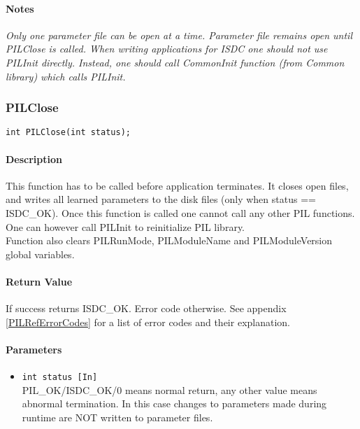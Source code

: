 \paragraph{Notes\\}
{\it
Only one parameter file can be open at a time. Parameter file remains open
until PILClose is called. When
writing applications for ISDC one should not use PILInit directly. Instead,
one should call CommonInit function
(from Common library) which calls PILInit. 
}



\subsubsection{PILClose}

\begin{verbatim}
int PILClose(int status); 
\end{verbatim}

\paragraph{Description\\}
This function has to be called before application terminates. It closes open
files, and writes all learned parameters
to the disk files (only when status == ISDC\_OK). Once this function is
called one cannot call any other PIL
functions. One can however call PILInit to reinitialize PIL library. \\
Function also clears PILRunMode, PILModuleName and PILModuleVersion global
variables. 

\paragraph{Return Value\\}
If success returns ISDC\_OK. Error code otherwise. See appendix \ref{PILRefErrorCodes}
for a list of error codes and their explanation.

\paragraph{Parameters}
\begin{itemize}
\item
{\tt int status [In] } \\
PIL\_OK/ISDC\_OK/0 means normal return, any other value means abnormal
termination. In this case changes to parameters made during runtime 
are NOT written to parameter files. 
\end{itemize}

